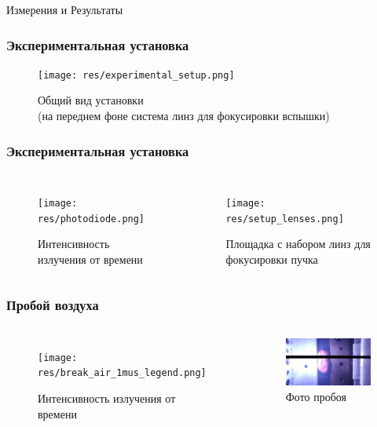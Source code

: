 \documentclass{beamer}
\begin{document}
	\begin{frame}[plain,c]
		
		\begin{center}
			\huge {} Измерения и Результаты
		\end{center}
		
	\end{frame}
	
	
	\begin{frame}
		\frametitle{Экспериментальная установка}
		\begin{figure}
			\centering
			\texttt{[image: res/experimental\_setup.png]}
			\caption*{Общий вид установки\\ \footnotesize (на переднем фоне система линз для фокусировки вспышки) }
		\end{figure}
	\end{frame}
	
	\begin{frame}
		\frametitle{Экспериментальная установка}
		\begin{columns}
			\column{0.5\linewidth}
			\begin{figure}
				\centering
				\texttt{[image: res/photodiode.png]}
				\caption*{Интенсивность излучения от времени}
			\end{figure}	
			\column{0.5\linewidth}
			\begin{figure}
				\centering
				\texttt{[image: res/setup\_lenses.png]}
				\caption*{Площадка с набором линз для фокусировки пучка}
			\end{figure}
		\end{columns}
	\end{frame}	
	
	\begin{frame}
		\frametitle{Пробой воздуха}
		\begin{columns}
			\column{0.6\linewidth}
			\begin{figure}
				\centering
				\texttt{[image: res/break\_air\_1mus\_legend.png]}
				\caption*{Интенсивность излучения от времени}
			\end{figure}	
			\column{0.4\linewidth}
			\begin{figure}
				\centering
				\includegraphics[width=\linewidth]{res/spark_air.png}
				\caption*{Фото пробоя}
			\end{figure}
		\end{columns}
	\end{frame}	
	
\end{document}

